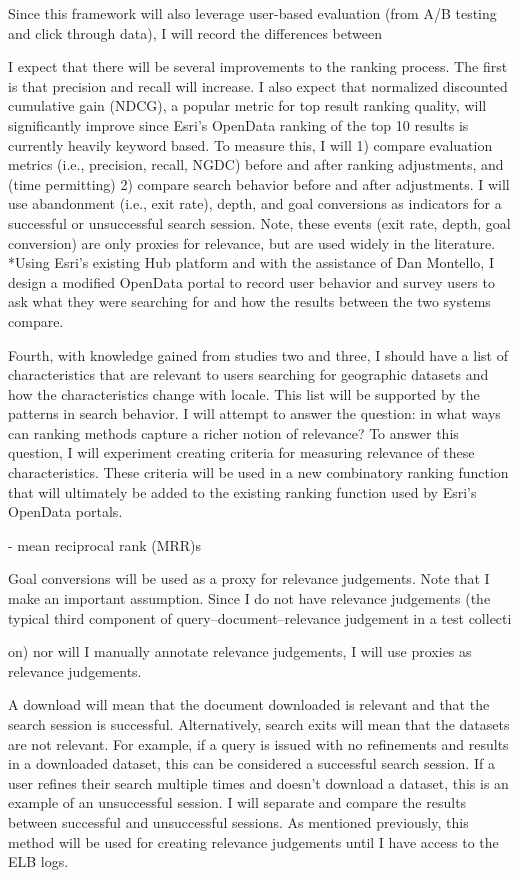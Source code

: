 Since this framework will also leverage user-based evaluation (from A/B testing and click through data), I will record the differences between 


 I expect that there will be several improvements to the ranking process. The first is that precision and recall will increase. I also expect that normalized discounted cumulative gain (NDCG), a popular metric for top result ranking quality, will significantly improve since Esri’s OpenData ranking of the top 10 results is currently heavily keyword based. To measure this, I will 1) compare evaluation metrics (i.e., precision, recall, NGDC) before and after ranking adjustments, and (time permitting) 2) compare search behavior before and after adjustments. I will use abandonment (i.e., exit rate), depth, and goal conversions as indicators for a successful or unsuccessful search session. Note, these events (exit rate, depth, goal conversion) are only proxies for relevance, but are used widely in the literature. *Using Esri’s existing Hub platform and with the assistance of Dan Montello, I design a modified OpenData portal to record user behavior and survey users to ask what they were searching for and how the results between the two systems compare.


Fourth, with knowledge gained from studies two and three, I should have a list of characteristics that are relevant to users searching for geographic datasets and how the characteristics change with locale. This list will be supported by the patterns in search behavior. I will attempt to answer the question: in what ways can ranking methods capture a richer notion of relevance? To answer this question, I will experiment creating criteria for measuring relevance of these characteristics. These criteria will be used in a new combinatory ranking function that will ultimately be added to the existing ranking function used by Esri’s OpenData portals.


- mean reciprocal rank (MRR)s



Goal conversions will be used as a proxy for relevance judgements. Note that I make an important assumption. Since I do not have relevance judgements (the typical third component of query–document–relevance judgement in a test collecti

on) nor will I manually annotate relevance judgements, I will use proxies as relevance judgements.

A download will mean that the document downloaded is relevant and that the search session is successful. Alternatively, search exits will mean that the datasets are not relevant. For example, if a query is issued with no refinements and results in a downloaded dataset, this can be considered a successful search session. If a user refines their search multiple times and doesn’t download a dataset, this is an example of an unsuccessful session. I will separate and compare the results between successful and unsuccessful sessions. As mentioned previously, this method will be used for creating relevance judgements until I have access to the ELB logs.

